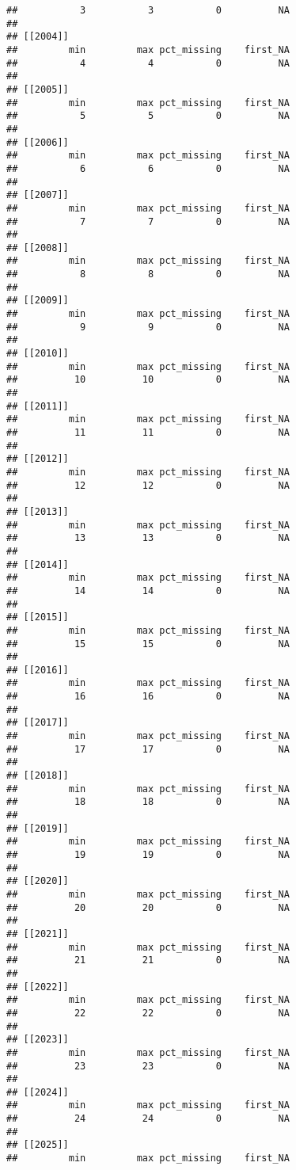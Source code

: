 \documentclass[
]{article}
\begin{document}
\begin{verbatim}
##           3           3           0          NA 
## 
## [[2004]]
##         min         max pct_missing    first_NA 
##           4           4           0          NA 
## 
## [[2005]]
##         min         max pct_missing    first_NA 
##           5           5           0          NA 
## 
## [[2006]]
##         min         max pct_missing    first_NA 
##           6           6           0          NA 
## 
## [[2007]]
##         min         max pct_missing    first_NA 
##           7           7           0          NA 
## 
## [[2008]]
##         min         max pct_missing    first_NA 
##           8           8           0          NA 
## 
## [[2009]]
##         min         max pct_missing    first_NA 
##           9           9           0          NA 
## 
## [[2010]]
##         min         max pct_missing    first_NA 
##          10          10           0          NA 
## 
## [[2011]]
##         min         max pct_missing    first_NA 
##          11          11           0          NA 
## 
## [[2012]]
##         min         max pct_missing    first_NA 
##          12          12           0          NA 
## 
## [[2013]]
##         min         max pct_missing    first_NA 
##          13          13           0          NA 
## 
## [[2014]]
##         min         max pct_missing    first_NA 
##          14          14           0          NA 
## 
## [[2015]]
##         min         max pct_missing    first_NA 
##          15          15           0          NA 
## 
## [[2016]]
##         min         max pct_missing    first_NA 
##          16          16           0          NA 
## 
## [[2017]]
##         min         max pct_missing    first_NA 
##          17          17           0          NA 
## 
## [[2018]]
##         min         max pct_missing    first_NA 
##          18          18           0          NA 
## 
## [[2019]]
##         min         max pct_missing    first_NA 
##          19          19           0          NA 
## 
## [[2020]]
##         min         max pct_missing    first_NA 
##          20          20           0          NA 
## 
## [[2021]]
##         min         max pct_missing    first_NA 
##          21          21           0          NA 
## 
## [[2022]]
##         min         max pct_missing    first_NA 
##          22          22           0          NA 
## 
## [[2023]]
##         min         max pct_missing    first_NA 
##          23          23           0          NA 
## 
## [[2024]]
##         min         max pct_missing    first_NA 
##          24          24           0          NA 
## 
## [[2025]]
##         min         max pct_missing    first_NA 

\end{verbatim}
\end{document}
